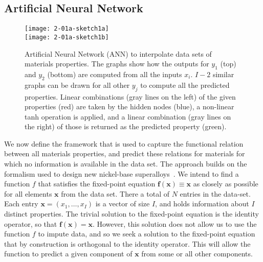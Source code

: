 \documentclass[review]{elsarticle}
\newcommand{\vx}{\textbf{x}}
\newcommand{\vf}{\textbf{f}}
\begin{document}
\subsection{Artificial Neural Network}\label{sec:ourframework}

\begin{figure}
 \centering
 \texttt{[image: 2-01a-sketch1a]}
 \\\vspace{0.5cm}
 \texttt{[image: 2-01a-sketch1b]}
 \caption{Artificial Neural Network (ANN) to interpolate data sets of
   materials properties. The graphs show how the outputs for $y_1$ (top) and 
   $y_2$ (bottom) are computed from all the inputs $x_i$. $I-2$ similar graphs 
   can be drawn for all other $y_j$ to compute all the predicted properties. 
   Linear combinations (gray lines on the left) of the
   given properties (red) are taken by the hidden nodes (blue), a non-linear
   tanh operation is applied, and a linear combination (gray lines on the
   right) of those is returned as the predicted property (green).}
 \label{fig:2-01a-sketch1}
\end{figure}

We now define the framework that is used to capture the functional relation
between all materials properties, and predict these relations for materials
for which no information is available in the data set. The approach builds
on the formalism used to design new nickel-base
superalloys~\cite{conduit17}. We intend to find a function $f$ that
satisfies the fixed-point equation $\vf(\vx)\equiv\vx$ as closely as
possible for all elements $\vx$ from the data set. There a total of $N$
entries in the data-set.  Each entry $\vx=(x_1,\ldots,x_{I})$ is a vector of
size $I$, and holds information about $I$ distinct properties.  The trivial
solution to the fixed-point equation is the identity operator, so that
$\vf(\vx)=\vx$. However, this solution does not allow us to use the function
$f$ to impute data, and so we seek a solution to the fixed-point equation
that by construction is orthogonal to the identity operator. This will allow
the function to predict a given component of $\vx$ from some or all other
components.
\end{document}
